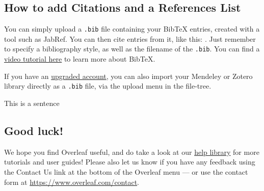 \documentclass{article}
\begin{document}
\subsection{How to add Citations and a References List}

You can simply upload a \verb|.bib| file containing your BibTeX entries, created with a tool such as JabRef. You can then cite entries from it, like this: \cite{greenwade93}. Just remember to specify a bibliography style, as well as the filename of the \verb|.bib|. You can find a \href{https://www.overleaf.com/help/97-how-to-include-a-bibliography-using-bibtex}{video tutorial here} to learn more about BibTeX.

If you have an \href{https://www.overleaf.com/user/subscription/plans}{upgraded account}, you can also import your Mendeley or Zotero library directly as a \verb|.bib| file, via the upload menu in the file-tree.


This is a sentence


\subsection{Good luck!}

We hope you find Overleaf useful, and do take a look at our \href{https://www.overleaf.com/learn}{help library} for more tutorials and user guides! Please also let us know if you have any feedback using the Contact Us link at the bottom of the Overleaf menu --- or use the contact form at \url{https://www.overleaf.com/contact}.

\cite{tommasiEnhancedCO2Methanation2025}



\end{document}
